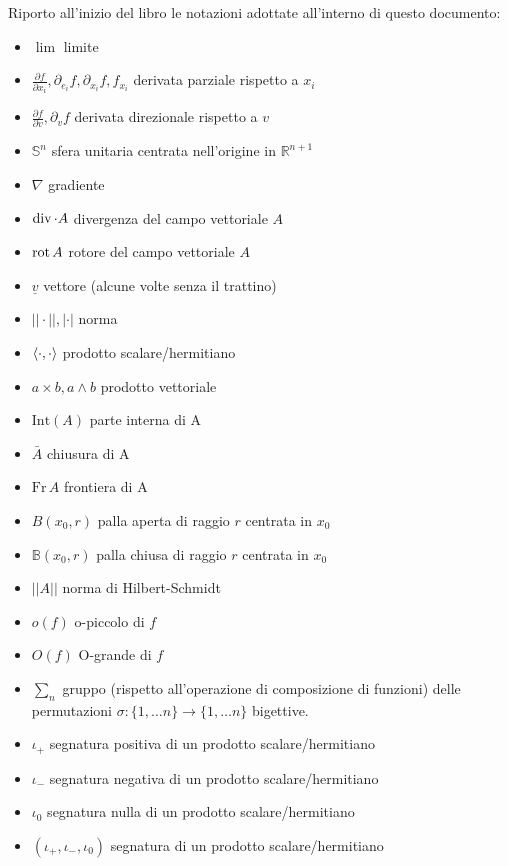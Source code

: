 \documentclass[12pt, twoside, italian]{book}
\begin{document}
	Riporto all'inizio del libro le notazioni adottate all'interno di questo documento:
	\begin{itemize}[label=\hspace{-0.5em}]
		\item $\lim$ limite		
		\item $\frac{\partial f}{\partial x_i}, \partial_{e_i} f, \partial_{x_i} f, f_{x_i}$ derivata parziale rispetto a $x_i$
		\item $\frac{\partial f}{\partial v}, \partial_v f$ derivata direzionale rispetto a $v$
		\item $\mathbb{S}^{n}$ sfera unitaria centrata nell'origine in $\mathbb{R}^{n+1}$
		\item $\nabla$ gradiente
		\item $\operatorname{div} \cdot A$ divergenza del campo vettoriale $A$
		\item $\operatorname{rot} A$ rotore del campo vettoriale $A$
		\item $\underline{v}$ vettore (alcune volte senza il trattino)
		\item $||\cdot||, |\cdot|$ norma
		\item $\langle \cdot, \cdot \rangle$ prodotto scalare/hermitiano
		\item $a \times b, a \wedge b$ prodotto vettoriale
		\item $\text{Int}(A)$ parte interna di A
		\item $\bar{A}$ chiusura di A
		\item $\text{Fr} \, A$ frontiera di A
		\item $B(x_0, r)$ palla aperta di raggio $r$ centrata in $x_0$
		\item $\mathbb{B}(x_0, r)$ palla chiusa di raggio $r$ centrata in $x_0$
		\item $|| A ||$ norma di Hilbert-Schmidt
		\item $o(f)$ o-piccolo di $f$
		\item $O(f)$ O-grande di $f$
		\item $\sum_{n}$ gruppo (rispetto all'operazione di composizione di funzioni) delle permutazioni $\sigma: \{1, \ldots n \} \to \{1, \ldots n \}$ bigettive.
		\item $\iota_+$ segnatura positiva di un prodotto scalare/hermitiano
		\item $\iota_-$ segnatura negativa di un prodotto scalare/hermitiano
		\item $\iota_0$ segnatura nulla di un prodotto scalare/hermitiano
		\item $(\iota_+, \iota_-, \iota_0)$ segnatura di un prodotto scalare/hermitiano

\end{itemize}
\end{document}
